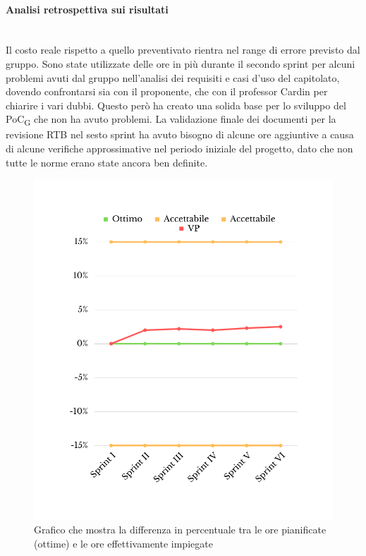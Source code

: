 \paragraph{Analisi retrospettiva sui risultati}\mbox{}\\
Il costo reale rispetto a quello preventivato rientra nel range di errore previsto dal gruppo. Sono state utilizzate delle ore in più durante il secondo sprint per alcuni problemi avuti dal gruppo nell'analisi dei requisiti e casi d'uso del capitolato, dovendo confrontarsi sia con il proponente, che con il professor Cardin per chiarire i vari dubbi. Questo però ha creato una solida base per lo sviluppo del PoC\textsubscript{G} che non ha avuto problemi. La validazione finale dei documenti per la revisione RTB nel sesto sprint ha avuto bisogno di alcune ore aggiuntive a causa di alcune verifiche approssimative nel periodo iniziale del progetto, dato che non tutte le norme erano state ancora ben definite.
\begin{figure}[H]
	\centering
	\includegraphics[scale=0.5]{img/SV.png}
	\caption{Grafico che mostra la differenza in percentuale tra le ore pianificate (ottime) e le ore effettivamente impiegate}
\end{figure}
